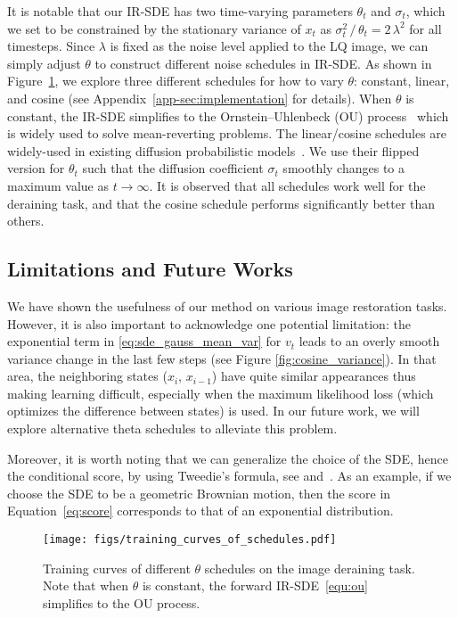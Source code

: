 \documentclass{article}
\theoremstyle{plain}
\theoremstyle{definition}
\theoremstyle{remark}
\begin{document}
It is notable that our IR-SDE has two time-varying parameters $\theta_t$ and $\sigma_t$, which we set to be constrained by the stationary variance of ${x}_t$ as $\sigma_t^2 \, / \, \theta_t = 2 \, \lambda^2$ for all timesteps. Since $\lambda$ is fixed as the noise level applied to the LQ image, we can simply adjust $\theta$ to construct different noise schedules in IR-SDE. As shown in Figure~\ref{fig:theta_schedule_curves}, we explore three different schedules for how to vary $\theta$: constant, linear, and cosine (see Appendix~\ref{app-sec:implementation} for details). When $\theta$ is constant, the IR-SDE simplifies to the Ornstein--Uhlenbeck (OU) process~\cite{gillespie1996exact} which is widely used to solve mean-reverting problems. The linear/cosine schedules are widely-used in existing diffusion probabilistic models~\cite{ho2020denoising,nichol2021improved}. We use their flipped version for $\theta_t$ such that the diffusion coefficient $\sigma_t$ smoothly changes to a maximum value as $t \to \infty$. It is observed that all schedules work well for the deraining task, and that the cosine schedule performs significantly better than others. 


\subsection{Limitations and Future Works}
\label{sec:limitations}
We have shown the usefulness of our method on various image restoration tasks. However, it is also important to acknowledge one potential limitation: the exponential term in \eqref{eq:sde_gauss_mean_var} for $v_t$ leads to an overly smooth variance change in the last few steps (see Figure \ref{fig:cosine_variance}). In that area, the neighboring states (${x}_i$, ${x}_{i-1}$) have quite similar appearances thus making learning difficult, especially when the maximum likelihood loss (which optimizes the difference between states) is used. In our future work, we will explore alternative theta schedules to alleviate this problem.

Moreover, it is worth noting that we can generalize the choice of the SDE, hence the conditional score, by using Tweedie's formula, see \citet[][Table 1]{Kim2021Tweedie} and~\citet{Kim2022Tweedie}. As an example, if we choose the SDE to be a geometric Brownian motion, then the score in Equation~\eqref{eq:score} corresponds to that of an exponential distribution.



\begin{figure}[t]
\begin{center}
\centerline{\texttt{[image: figs/training\_curves\_of\_schedules.pdf]}}\vspace{-2.0mm}
\caption{Training curves of different $\theta$ schedules on the image deraining task. Note that when $\theta$ is constant, the forward IR-SDE~\eqref{equ:ou} simplifies to the OU process.}
\label{fig:theta_schedule_curves}
\end{center}
\vskip -0.2in
\end{figure}
\end{document}
